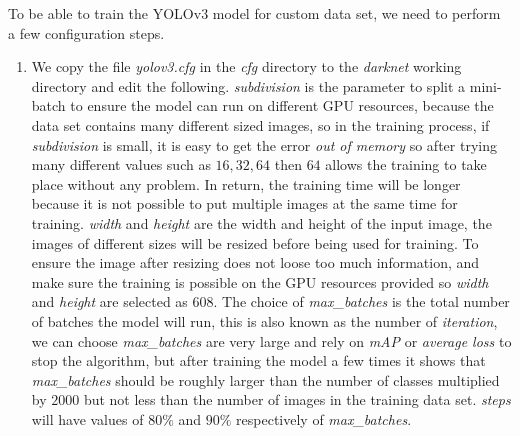 \documentclass[conference]{IEEEtran}
\begin{document}
To be able to train the YOLOv3 model for custom data set, we need to perform a few configuration steps.
\begin{enumerate}
	\item We copy the file \emph{yolov3.cfg} in the \emph{cfg} directory to the \emph{darknet} working directory and edit the following. \emph{subdivision} is the parameter to split a mini-batch to ensure the model can run on different GPU resources, because the data set contains many different sized images, so in the training process, if \emph{subdivision} is small, it is easy to get the error \emph{out of memory} so after trying many different values such as $ 16, 32, 64 $ then $ 64 $ allows the training to take place without any problem. In return, the training time will be longer because it is not possible to put multiple images at the same time for training. \emph{width} and \emph{height} are the width and height of the input image, the images of different sizes will be resized before being used for training. To ensure the image after resizing does not loose too much information, and make sure the training is possible on the GPU resources provided so \emph{width} and \emph{height} are selected as $ 608 $. The choice of \emph{max{\_}batches} is the total number of batches the model will run, this is also known as the number of \emph{iteration}, we can choose \emph{max{\_}batches} are very large and rely on \emph{mAP} or \emph{average loss} to stop the algorithm, but after training the model a few times it shows that \emph{max{\_}batches} should be roughly larger than the number of classes multiplied by $ 2000 $ but not less than the number of images in the training data set. \emph{steps} will have values of $ 80 \% $ and $ 90 \% $ respectively of \emph{max{\_}batches}.
	

\end{enumerate}
\end{document}
